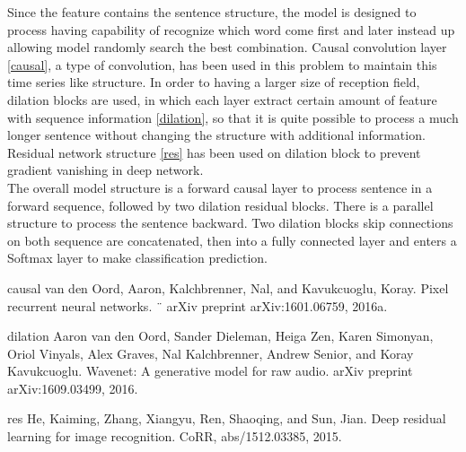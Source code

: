 Since the feature contains the sentence structure, the model is designed to process having capability of recognize which word come first and later instead up allowing model randomly search the best combination. Causal convolution layer \ref{causal}, a type of convolution, has been used in this problem to maintain this time series like structure. In order to having a larger size of reception field, dilation blocks are used, in which each layer extract certain amount of feature with sequence information \ref{dilation}, so that it is quite possible to process a much longer sentence without changing the structure with additional information. Residual network structure \ref{res} has been used on dilation block to prevent gradient vanishing in deep network. \\
The overall model structure is a forward causal layer to process sentence in a forward sequence, followed by two dilation residual blocks. There is a parallel structure to process the sentence backward. Two dilation blocks skip connections on both sequence are concatenated, then into a fully connected layer and enters a Softmax layer to make classification prediction.

causal
van den Oord, Aaron, Kalchbrenner, Nal, and Kavukcuoglu, Koray. Pixel recurrent neural networks. ¨
arXiv preprint arXiv:1601.06759, 2016a.

dilation
Aaron van den Oord, Sander Dieleman, Heiga Zen, Karen Simonyan, Oriol Vinyals, Alex
Graves, Nal Kalchbrenner, Andrew Senior, and Koray Kavukcuoglu. Wavenet: A generative
model for raw audio. arXiv preprint arXiv:1609.03499, 2016.

res
He, Kaiming, Zhang, Xiangyu, Ren, Shaoqing, and Sun, Jian. Deep residual learning for image
recognition. CoRR, abs/1512.03385, 2015.